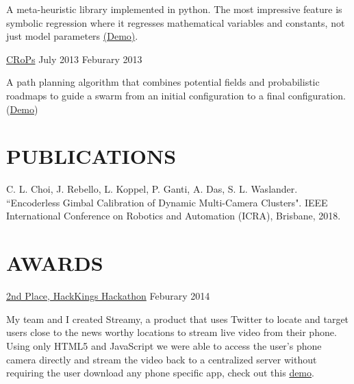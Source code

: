 \documentclass[line,margin]{cv}
\begin{document}
\begin{resume}
\vspace{0.1em}
\begin{adjustwidth}{2.0em}{2.0em}
    A meta-heuristic library implemented in python. The most impressive feature 
    is symbolic regression where it regresses mathematical variables and constants, 
    not just model parameters 
    \href{https://www.youtube.com/watch?v=dPjBrLjSBl4}{(Demo)}.
\end{adjustwidth}

\href{https://github.com/wallarelvo/CRoPS}{CRoPs}
\hfill July 2013 \textemdash{} Feburary 2013

\vspace{0.1em}
\begin{adjustwidth}{2.0em}{2.0em}
    A path planning algorithm that combines potential fields and probabilistic
    roadmaps to guide a swarm from an initial configuration to a final
    configuration. (\href{https://www.youtube.com/watch?v=XTZ82zrKzEU}{Demo})
\end{adjustwidth}



\section{PUBLICATIONS} 

\begin{adjustwidth}{2.0em}{2.0em}
	C. L. Choi, J. Rebello, L. Koppel, P. Ganti, A. Das, S. L. Waslander. 
	``Encoderless Gimbal Calibration of Dynamic Multi-Camera Clusters". 
	IEEE International Conference on Robotics and Automation (ICRA), 
	Brisbane, 2018.
\end{adjustwidth}



\section{AWARDS}

\href{https://hackkings2014s.devpost.com/submissions}{2nd Place, HackKings Hackathon}
\hfill Feburary 2014

\begin{adjustwidth}{2.0em}{2.0em}
    My team and I created Streamy, a product that uses Twitter to locate 
    and target users close to the news worthy locations to stream live video 
    from their phone. Using only HTML5 and JavaScript we were able to access 
    the user's phone camera directly and stream the video back to a 
    centralized server without requiring the user download any phone specific 
    app, check out this \href{http://www.youtube.com/watch?v=JjMc1OaKEU0}{demo}.
\end{adjustwidth}


\end{resume}
\end{document}
